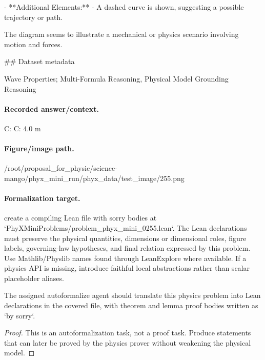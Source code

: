 - **Additional Elements:**
  - A dashed curve is shown, suggesting a possible trajectory or path.

The diagram seems to illustrate a mechanical or physics scenario involving motion and forces.

\#\# Dataset metadata

Wave Properties; Multi-Formula Reasoning, Physical Model Grounding Reasoning

\paragraph{Recorded answer/context.}
C: C: 4.0 m

\paragraph{Figure/image path.}
/root/proposal\_for\_physic/science-mango/phyx\_mini\_run/phyx\_data/test\_image/255.png

\paragraph{Formalization target.}
create a compiling Lean file with sorry bodies at `PhyXMiniProblems/problem\_phyx\_mini\_0255.lean`. The Lean declarations must preserve the physical quantities, dimensions or dimensional roles, figure labels, governing-law hypotheses, and final relation expressed by this problem.
Use Mathlib/Physlib names found through LeanExplore where available. If a physics API is missing, introduce faithful local abstractions rather than scalar placeholder aliases.

\begin{theorem}
\label{thm:physics:phyx_mini_0255:target}
The assigned autoformalize agent should translate this physics problem into Lean declarations in the covered file, with theorem and lemma proof bodies written as `by sorry`.
\end{theorem}
\begin{proof}
This is an autoformalization task, not a proof task. Produce statements that can later be proved by the physics prover without weakening the physical model.
\end{proof}

